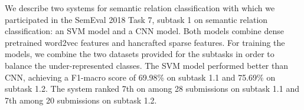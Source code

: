 We describe two systems for semantic relation classification with which we participated in the SemEval 2018 Task 7, subtask 1 on semantic relation classification: an SVM model and a CNN model. Both models combine dense pretrained word2vec features and hancrafted sparse features. For training the models, we combine the two datasets provided for the subtasks in order to balance the under-represented classes. The SVM model performed better than CNN, achieving a F1-macro score of 69.98\% on subtask 1.1 and 75.69\% on subtask 1.2. The system ranked 7th on among 28 submissions on subtask 1.1 and 7th among 20 submissions on subtask 1.2.

